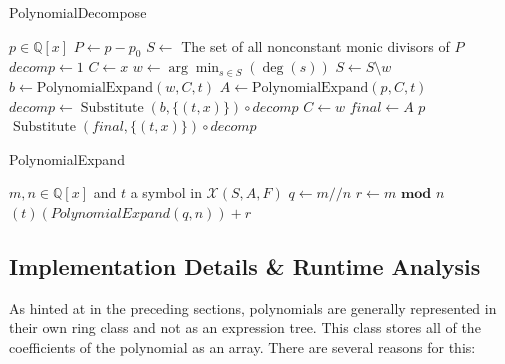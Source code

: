 \documentclass{article}
\theoremstyle{definition}
\DeclareMathOperator{\subs}{Substitute}
\begin{document}
\begin{algorithm}\small
\caption{PolynomialDecompose}
    \begin{algorithmic}[1]
        \Require $p \in \mathbb{Q}[x]$
        \State $P \gets p - p_0$
        \State $S \gets $ The set of all nonconstant monic divisors of $P$
        \State $decomp \gets 1$
        \State $C \gets x$
            \State $w \gets \arg \min_{s \in S}(\deg(s))$
            \State $S \gets S \setminus w$
                \State $b \gets \text{PolynomialExpand}(w, C, t)$
                \State $A \gets \text{PolynomialExpand}(p, C, t)$
                    \State $decomp \gets \subs(b, \{(t,x)\}) \circ decomp$
                    \State $C \gets w$
                    \State $final \gets A$
                \EndIf
            \EndIf
            \EndWhile
        \State \Return $p$
        \EndIf
        \State \Return $\subs(final, \{(t, x)\}) \circ decomp$
    \end{algorithmic}
\end{algorithm}

\begin{algorithm}\small
\caption{PolynomialExpand}
    \begin{algorithmic}[1]
        \Require $m,n \in \mathbb{Q}[x]$ and $t$ a symbol in $\mathcal{X}(S, A, F)$
        \State $q \gets m // n$
        \State $r \gets m \textbf{ mod } n$
        \State \Return $(t)(PolynomialExpand(q, n)) + r$
    \end{algorithmic}
\end{algorithm}



\subsection{Implementation Details \& Runtime Analysis}


As hinted at in the preceding sections, polynomials are generally represented in their own ring class and not as an expression tree. This class stores all of the coefficients of the polynomial as an array. There are several reasons for this:
\end{document}
